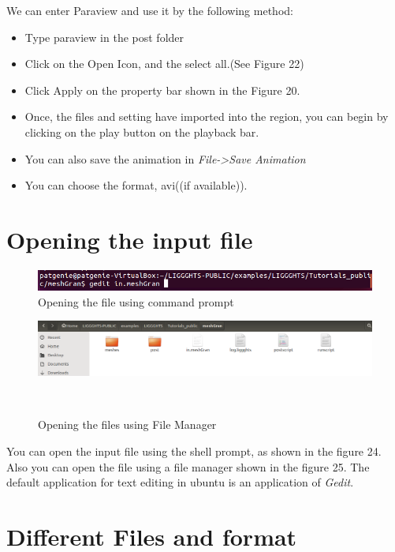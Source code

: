 \documentclass{tufte-book} %
\begin{document}
 We can enter Paraview and use it by the following method:
 \begin{itemize}
 \item Type paraview in the post folder
 \item Click on the Open Icon, and the select all.(See Figure 22)
 \item Click Apply on the property bar shown in the Figure 20.
 \item Once, the files and setting have imported into the region, you can begin by clicking on the play button on the playback bar. 
 \item You can also save the animation in \emph{File->Save Animation}
 \item You can choose the format, avi((if available)).
 
 \end{itemize}
\section{Opening the input file}

\begin{figure}
  \includegraphics[width=\linewidth]{graphics/Screenshot/Gif1.png}
  \caption{Opening the file using command prompt}
  \end{figure}

\begin{figure}
\includegraphics[width=\linewidth]{graphics/Screenshot/Gif3.png}
  \caption{Opening the files using File Manager}
\\\vspace{\baselineskip}
\end{figure}

You can open the input file using the shell prompt, as shown in the figure 24. Also you can open the file using a file manager shown in the figure 25. The default application for text editing in ubuntu is an application of \emph{Gedit}.

\section{Different Files and format }
\end{document}
